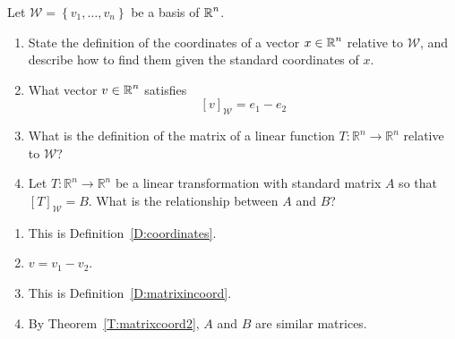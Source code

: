 \documentclass{ximera}
\author{Matthew Carr \& Marty Golubitsky}
\begin{document}
\begin{exercise}\label{mc.exerciseErr4}




Let $\mathcal{W}=\left\{v_1,\ldots ,v_n\right\}$ be a basis of $\mbox{$\Bbb{R}$}^n$.
\begin{enumerate}[label=(\alph*)]
\item State the definition of the coordinates of a vector $x \in\mbox{$\Bbb{R}$}^n$ relative to $\mathcal{W}$, and describe how to find them given the standard coordinates of $x$.
\item What vector $v\in \mbox{$\Bbb{R}$}^n$ satisfies
\[
[v]_{\mathcal{W}}= e_1 - e_2
\]
\item What is the definition of the matrix of a linear function $T:\mathbb{R}^n\rightarrow\mathbb{R}^n$ relative to $\mathcal{W}$?
\item Let $T:\mathbb{R}^n\rightarrow\mathbb{R}^n$ be a linear transformation with standard matrix $A$ so that $[T]_{\mathcal{W}}=B$. What is the relationship between $A$ and $B$?
\end{enumerate}


\begin{solution}
\ans
\begin{enumerate}[label=(\alph*)]
\item This is Definition~\ref{D:coordinates}. 
\item $v = v_1 - v_2$.
\item This is Definition~\ref{D:matrixincoord}.
\item By Theorem~\ref{T:matrixcoord2},  $A$ and $B$ are similar matrices. 
\end{enumerate}
\end{solution}
\end{exercise}
\end{document}
